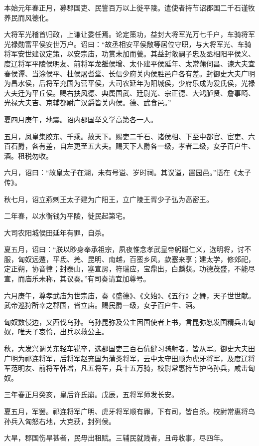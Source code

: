\documentclass[]{article}
\begin{document}
本始元年春正月，募郡国吏、民訾百万以上徙平陵。遣使者持节诏郡国二千石谨牧养民而风德化。

大将军光稽首归政，上谦让委任焉。论定策功，益封大将军光万七千户，车骑将军光禄勋富平侯安世万户。诏曰：``故丞相安平侯敞等居位守职，与大将军光、车骑将军安世建议定策，以安宗庙，功赏未加而甍。其益封敞嗣子忠及丞相阳平侯义、度辽将军平陵侯明友、前将军龙雒侯增、太仆建平侯延年、太常蒲伺昌、谏大夫宜春侯谭、当涂侯平、杜侯屠耆堂、长信少府关内侯胜邑户各有差。封御史大夫广明为昌水侯，后将军充国为营平侯，大司农延年为阳城侯，少府乐成为爰氏侯，光禄大夫迁为平丘侯。赐右扶风德、典属国武、廷尉光、宗正德、大鸿胪贤、詹事畸、光禄大夫吉、京辅都尉广汉爵皆关内侯。德、武食邑。''

夏四月庚午，地震。诏内郡国举文学高第各一人。

五月，凤皇集胶东、千乘。赦天下。赐吏二千石、诸侯相、下至中都官、宦吏、六百石爵，各有差，自左更至五大夫。赐天下人爵各一级，孝者二级，女子百户牛、酒。租税勿收。

六月，诏曰：``故皇太子在湖，未有号谥、岁时祠。其议谥，置园邑。''语在《太子传》。

秋七月，诏立燕剌王太子建为广阳王，立广陵王胥少子弘为高密王。

二年春，以水衡钱为平陵，徙民起第宅。

大司农阳城侯田延年有罪，自杀。

夏五月，诏曰：``朕以眇身奉承祖宗，夙夜惟念孝武皇帝躬履仁义，选明将，讨不服，匈奴远遁，平氐、羌、昆明、南越，百蛮乡风，款塞来享；建太学，修郊祀，定正朔，协音律；封泰山，塞宣房，符瑞应，宝鼎出，白麟获。功德茂盛，不能尽宣，而庙乐未称，其议奏。''有司奏请宜加尊号。

六月庚午，尊孝武庙为世宗庙，奏《盛德》、《文始》、《五行》之舞，天子世世献。武帝巡狩所幸之郡国，皆立庙。赐民爵一级，女子百户牛、酒。

匈奴数侵边，又西伐乌孙。乌孙昆弥及公主因国使者上书，言昆弥愿发国精兵击匈奴，唯天子哀怜，出兵以救公主。

秋，大发兴调关东轻车锐卒，选郡国吏三百石伉健习骑射者，皆从军。御史大夫田广明为祁连将军，后将军赵充国为蒲类将军，云中太守田顺为虎牙将军，及度辽将军范明友、前将军韩增，凡五将军，兵十五万骑，校尉常惠持节护乌孙兵，咸击匈奴。

三年春正月癸亥，皇后许氏崩。戊辰，五将军师发长安。

夏五月，军罢。祁连将军广明、虎牙将军顺有罪，下有司，皆自杀。校尉常惠将乌孙兵入匈怒右地，大克获，封列侯。

大旱，郡国伤旱甚者，民毋出租赋。三辅民就贱者，且毋收事，尽四年。
\end{document}
